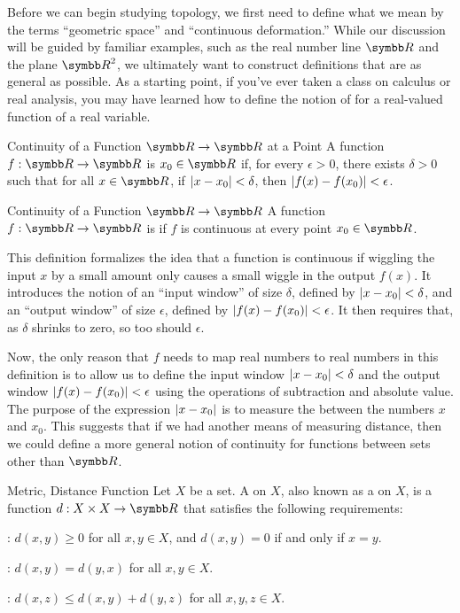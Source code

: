 \documentclass[12pt]{article}
\begin{document}
Before we can begin studying topology, we first need to define what we mean by the terms ``geometric space'' and ``continuous deformation.'' While our discussion will be guided by familiar examples, such as the real number line $\R$ and the plane $\R^2$, we ultimately want to construct definitions that are as general as possible. As a starting point, if you've ever taken a class on calculus or real analysis, you may have learned how to define the notion of  for a real-valued function of a real variable.

\begin{dfnbox}{Continuity of a Function $\R \to \R$ at a Point}
	A function $f: \R \to \R$ is  $x_0 \in \R$ if, for every $\epsilon > 0$, there exists $\delta > 0$ such that for all $x \in \R$, if ${\left\lvert {x - x_0} \right\rvert} < \delta$, then ${\left\lvert {f(x) - f(x_0)} \right\rvert} < \epsilon$.
\end{dfnbox}

\begin{dfnbox}{Continuity of a Function $\R \to \R$}
	A function $f: \R \to \R$ is  if $f$ is continuous at every point $x_0 \in \R$.
\end{dfnbox}

This definition formalizes the idea that a function is continuous if wiggling the input $x$ by a small amount only causes a small wiggle in the output $f(x)$. It introduces the notion of an ``input window'' of size $\delta$, defined by ${\left\lvert {x - x_0} \right\rvert} < \delta$, and an ``output window'' of size $\epsilon$, defined by ${\left\lvert {f(x) - f(x_0)} \right\rvert} < \epsilon$. It then requires that, as $\delta$ shrinks to zero, so too should $\epsilon$.

Now, the only reason that $f$ needs to map real numbers to real numbers in this definition is to allow us to define the input window ${\left\lvert {x - x_0} \right\rvert} < \delta$ and the output window ${\left\lvert {f(x) - f(x_0)} \right\rvert} < \epsilon$ using the operations of subtraction and absolute value. The purpose of the expression ${\left\lvert {x - x_0} \right\rvert}$ is to measure the  between the numbers $x$ and $x_0$. This suggests that if we had another means of measuring distance, then we could define a more general notion of continuity for functions between sets other than $\R$.

\begin{dfnbox}{Metric, Distance Function}
	Let $X$ be a set. A  on $X$, also known as a  on $X$, is a function $d: X \times X \to \R$ that satisfies the following requirements:
	\begin{boxitems}
		\item {}: $d(x, y) \ge 0$ for all $x, y \in X$, and $d(x, y) = 0$ if and only if $x = y$.
		\item {}: $d(x, y) = d(y, x)$ for all $x, y \in X$.
		\item {}: $d(x, z) \le d(x, y) + d(y, z)$ for all $x, y, z \in X$.
	\end{boxitems}
\end{dfnbox}
\end{document}
